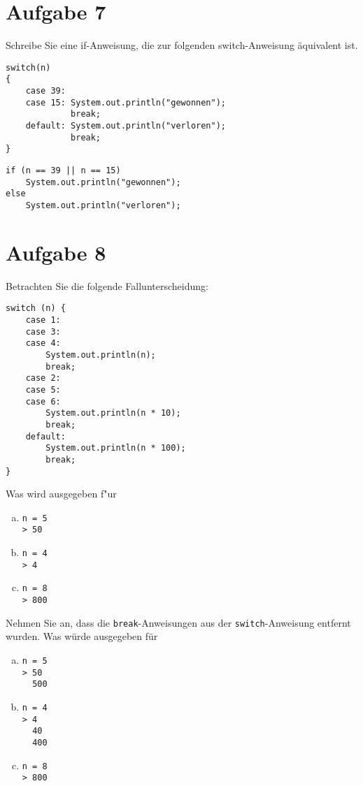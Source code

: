 \documentclass[10pt, oneside]{article}
\begin{document}
\section{Aufgabe 7}

Schreibe Sie eine if-Anweisung, die zur folgenden switch-Anweisung äquivalent
ist.

\begin{verbatim}
switch(n)
{
    case 39:
    case 15: System.out.println("gewonnen");
             break;
    default: System.out.println("verloren");
             break;
}
\end{verbatim}

\begin{verbatim}
if (n == 39 || n == 15)
    System.out.println("gewonnen");
else
    System.out.println("verloren");
\end{verbatim}

\pagebreak
\section{Aufgabe 8}

Betrachten Sie die folgende Fallunterscheidung:

\begin{verbatim}
switch (n) {
    case 1:
    case 3:
    case 4:
        System.out.println(n);
        break;
    case 2:
    case 5:
    case 6:
        System.out.println(n * 10);
        break;
    default:
        System.out.println(n * 100);
        break;
}
\end{verbatim}

Was wird ausgegeben f"ur
\begin{enumerate}[(a)]
    \item \verb|n = 5| \\
        \verb|> 50|
    \item \verb|n = 4| \\
        \verb|> 4|
    \item \verb|n = 8| \\
        \verb|> 800|
\end{enumerate}

Nehmen Sie an, dass die \verb|break|-Anweisungen aus der
\verb|switch|-Anweisung entfernt wurden. Was würde ausgegeben für
\begin{enumerate}[(a)]
    \item \verb|n = 5| \\
        \verb|> 50| \\
        \verb|  500|
    \item \verb|n = 4| \\
        \verb|> 4| \\
        \verb|  40| \\
        \verb|  400|
    \item \verb|n = 8| \\
        \verb|> 800|
\end{enumerate}
\end{document}

